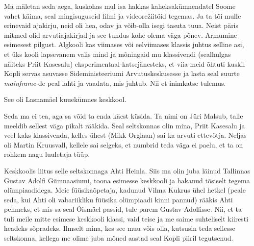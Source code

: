 

Ma mäletan  seda aega, kuskohas mul isa hakkas kaheksakümnendatel Soome vahet 
käima, seal mingisuguseid
filmi ja videorežiitöid tegemas. Ja ta tõi mulle erinevaid ajakirju, neid oli 
hea, odav ja võib-olla isegi tasuta tuua. Neist päris mitmed olid 
arvutiajakirjad ja see tundus kohe olema väga põnev. Armumine esimesest 
pilgust. Algkooli kas  viimases või eelviimases klassis juhtus selline asi, et 
üks kooli lapsevanem valis mind ja mõningaid mu klassivendi (sealhulgas näiteks 
Priit Kasesalu) eksperimentaal-katsejänesteks, et 
viia  meid õhtuti  kuskil Kopli servas asuvasse Sideministeeriumi 
Arvutuskeskusesse ja lasta seal 
suurte \emph{mainframe}-de peal lahti ja vaadata, mis juhtub. Nii et inimkatse 
tulemus. 


See oli Lasnamäel kuuekümnes keskkool.


Seda ma ei tea, aga sa võid ta enda käest küsida. Ta nimi on Jüri 
Malsub, talle meeldib sellest väga pikalt rääkida. 
Seal seltskonnas olin mina, Priit Kasesalu ja veel kaks klassivenda, kelles 
ühest (Mikk Orglaan) sai ka arvuti-ettevõtja. Neljas 
oli Martin Kruusvall, kellele sai selgeks, et 
numbrid teda väga ei paelu, et ta on rohkem nagu luuletaja tüüp.

Keskkoolis liitus selle seltskonnaga Ahti Heinla. Siis 
ma olin juba läinud Tallinnas Gustav Adolfi Gümnaasiumi, toona esimesse 
keskkooli ja hakanud tõsiselt tegema 
olümpiaadidega. Meie füüsikaõpetaja, kadunud Vilma Kukrus ühel hetkel (peale seda, kui Ahti oli vabariikliku füüsika olümpiaadi 
kinni pannud) rääkis Ahti pehmeks, et mis sa seal Õismäel passid, tule parem 
Gustav Adolfisse. Nii, et ta tuli meile mitte esimese keskkooli klassi, vaid  
teise  ja me saime suhteliselt kiiresti headeks sõpradeks. Ilmselt mina, kes 
see muu võis olla, kutsusin teda sellesse seltskonna, kellega me olime juba  
mõned aastad seal Kopli piiril tegutsenud. 


